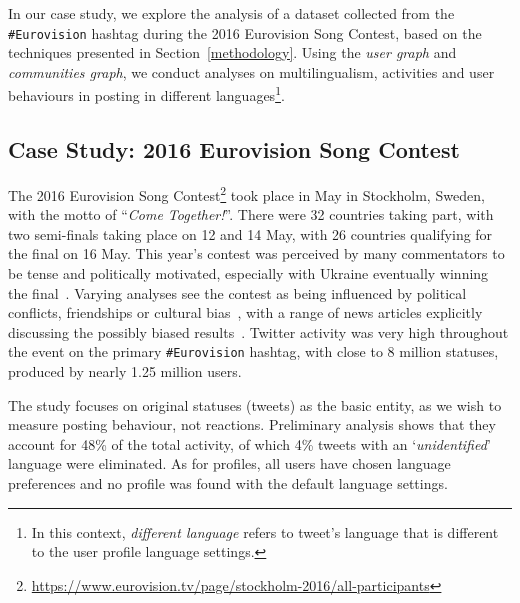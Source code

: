 \documentclass{llncs}
\begin{document}
In our case study, we explore the analysis of a dataset collected from
the {\texttt{\#Eurovision}} hashtag during the 2016 Eurovision Song
Contest, based on the techniques presented in
Section~\ref{methodology}. Using the \emph{user graph} and
\emph{communities graph}, we conduct analyses on multilingualism,
activities and user behaviours in posting in different
languages\footnote{In this context, \emph{different language} refers
to tweet's language that is different to the user profile language
settings.}.

\subsection{Case Study: 2016 Eurovision Song Contest}\label{context}

The 2016 Eurovision Song
Contest\footnote{\url{https://www.eurovision.tv/page/stockholm-2016/all-participants}}
took place in May in Stockholm, Sweden, with the motto of
``{\emph{Come Together!}}''. There were 32 countries taking part, with
two semi-finals taking place on 12 and 14 May, with 26 countries
qualifying for the final on 16 May. This year's contest was perceived
by many commentators to be tense and politically motivated, especially
with Ukraine eventually winning the
final~\cite{telegrapheuroboycott:2016}. Varying analyses see the
contest as being influenced by political conflicts, friendships or
cultural
bias~\cite{ginsburgh+noury:2008,charron:2013,blangiardo+baio:2014,budzinski+pannicke:2016},
with a range of news articles explicitly discussing the possibly
biased results~\cite{telegrapheurobias:2016}.  Twitter activity was
very high throughout the event on the primary {\texttt{\#Eurovision}}
hashtag, with close to 8 million statuses, produced by nearly 1.25
million users.


The study focuses on original statuses (tweets) as the basic entity,
as we wish to measure posting behaviour, not reactions. Preliminary
analysis shows that they account for 48\% of the total activity, of
which 4\% tweets with an `{\emph{unidentified}}' language were
eliminated. As for profiles, all users have chosen language
preferences and no profile was found with the default language
settings.
\end{document}
